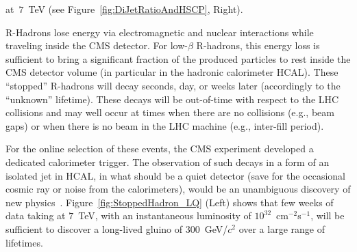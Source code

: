 \documentclass{PoS}
\begin{document}
at~$7$~TeV (see Figure~\ref{fig:DiJetRatioAndHSCP}, Right).
%
%

R-Hadrons lose energy via electromagnetic and nuclear interactions 
while traveling inside the CMS detector. For low-$\beta$ R-hadrons, this energy loss is 
sufficient to bring a significant fraction of the produced particles 
to rest inside the CMS detector volume (in particular in the hadronic calorimeter HCAL). 
These ``stopped'' R-hadrons will decay seconds, day, or weeks later (accordingly to 
the ``unknown'' lifetime). These decays will be out-of-time with respect to the LHC collisions 
and may well occur at times when there are no collisions (e.g., beam gaps) or when there is no beam in 
the LHC machine (e.g., inter-fill period).

For the online selection of these events, the CMS experiment 
developed a dedicated calorimeter trigger. The observation of such decays in a form of an isolated jet 
in HCAL, in what should be a quiet detector (save for the occasional cosmic ray or noise from the 
calorimeters), would be an unambiguous discovery of new physics~\cite{StoppedGluinoPAS}. 
Figure~\ref{fig:StoppedHadron_LQ} (Left) shows 
that few weeks of data taking at $7$~TeV, with an instantaneous luminosity of  $10^{32}$~cm$^{-2}$s$^{-1}$, 
will be sufficient to discover a long-lived gluino of 300~GeV/$c^2$ over a large range of lifetimes.
\end{document}
